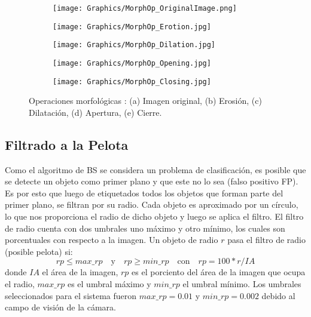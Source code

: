 \begin{figure}[h!]
	\centering
	\begin{subfigure}[b]{0.32\linewidth}
		\centering
		\texttt{[image: Graphics/MorphOp\_OriginalImage.png]}
		\caption{}
	\end{subfigure}
	\begin{subfigure}[b]{0.32\linewidth}
		\centering
		\texttt{[image: Graphics/MorphOp\_Erotion.jpg]}
		\caption{}
	\end{subfigure}
	\begin{subfigure}[b]{0.32\linewidth}
		\centering
		\texttt{[image: Graphics/MorphOp\_Dilation.jpg]}
		\caption{}
	\end{subfigure}
	\begin{subfigure}[b]{0.32\linewidth}
		\centering
		\texttt{[image: Graphics/MorphOp\_Opening.jpg]}
		\caption{}
	\end{subfigure}
	\begin{subfigure}[b]{0.32\linewidth}
		\centering
		\texttt{[image: Graphics/MorphOp\_Closing.jpg]}
		\caption{}
	\end{subfigure}
	\caption{Operaciones morfológicas : (a) Imagen original, (b) Erosión, (c) Dilatación, (d) Apertura, (e) Cierre.}
	\label{fig:MorphOp}
\end{figure}

\subsection{Filtrado a la Pelota}

Como el algoritmo de BS se considera un problema de clasificación, es posible que se detecte un objeto como primer plano y que este no lo sea (falso positivo FP). Es por esto que luego de etiquetados todos los objetos que forman parte del primer plano, se filtran por su radio. Cada objeto es aproximado por un círculo, lo que nos proporciona el radio de dicho objeto y luego se aplica el filtro. El filtro de radio cuenta con dos umbrales uno máximo y otro mínimo, los cuales son porcentuales con respecto a la imagen. Un objeto de radio $r$ pasa el filtro de radio (posible pelota) si:
$$rp \leq max\_rp \quad \text{y} \quad rp \geq min\_rp \quad \text{con} \quad rp = 100*r/IA$$
donde $IA$ el área de la imagen, $rp$ es el porciento del área de la imagen que ocupa el radio, $max\_rp$ es el umbral máximo y $min\_rp$ el umbral mínimo. Los umbrales seleccionados para el sistema fueron $max\_rp = 0.01$ y $min\_rp = 0.002$ debido al campo de visión de la cámara. 


